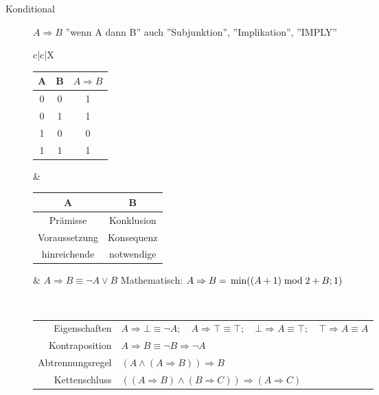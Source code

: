 \documentclass[12pt,a4paper]{article}
\begin{document}
\begin{description}
\begin{description}
			\item[Konditional] $A\Rightarrow B$ ''wenn A dann B'' auch ''Subjunktion'', ''Implikation'', ''IMPLY'' \\
				\begin{tabularx}{\linewidth}{c|c|X}
					\begin{tabular}[t]{c|c||c}
						A & B & $A \Rightarrow B$ \\ \hline\hline
						0 & 0 & 1 \\ \hline
						0 & 1 & 1 \\ \hline
						1 & 0 & 0 \\ \hline
						1 & 1 & 1
					\end{tabular} &
					\begin{tabular}[t]{c|c}
						A & B \\ \hline
						Prämisse & Konklusion \\
						Voraussetzung & Konsequenz \\
						hinreichende & notwendige
					\end{tabular} &
					$A \Rightarrow B \equiv \neg A \vee B$ \newline
					Mathematisch: $A \Rightarrow B = \newline \min((A + 1) \bmod 2 + B; 1)$ \\ \hline
				\end{tabularx} \\
				\begin{tabular}[t]{rl}
					Eigenschaften & $A \Rightarrow \bot \equiv \neg A; \quad A \Rightarrow \top \equiv \top; \quad \bot \Rightarrow A \equiv \top; \quad \top \Rightarrow A \equiv A$ \\
					Kontraposition & $A \Rightarrow B \equiv \neg B \Rightarrow \neg A$ \\
					Abtrennungsregel & $(A \wedge (A \Rightarrow B)) \Rightarrow B$ \\
					Kettenschluss & $((A \Rightarrow B) \wedge (B \Rightarrow C)) \Rightarrow (A \Rightarrow C)$
				\end{tabular}							
				

\end{description}
\end{description}
\end{document}
